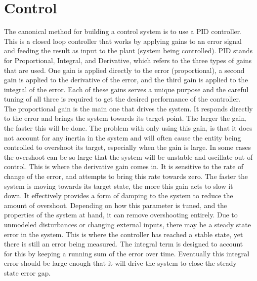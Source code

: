 \documentclass[letterpaper,12pt,titlepage,oneside,final]{book}
\begin{document}
\section{Control}


The canonical method for building a control system is to use a PID controller. This is a closed loop controller that works by applying gains to an error signal and feeding the result as input to the plant (system being controlled). PID stands for Proportional, Integral, and Derivative, which refers to the three types of gains that are used. One gain is applied directly to the error (proportional), a second gain is applied to the derivative of the error, and the third gain is applied to the integral of the error. Each of these gains serves a unique purpose and the careful tuning of all three is required to get the desired performance of the controller. The proportional gain is the main one that drives the system. It responds directly to the error and brings the system towards its target point. The larger the gain, the faster this will be done. The problem with only using this gain, is that it does not account for any inertia in the system and will often cause the entity being controlled to overshoot its target, especially when the gain is large. In some cases the overshoot can be so large that the system will be unstable and oscillate out of control. This is where the derivative gain comes in. It is sensitive to the rate of change of the error, and attempts to bring this rate towards zero. The faster the system is moving towards its target state, the more this gain acts to slow it down. It effectively provides a form of damping to the system to reduce the amount of overshoot. Depending on how this parameter is tuned, and the properties of the system at hand, it can remove overshooting entirely. Due to unmodeled disturbances or changing external inputs, there may be a steady state error in the system. This is where the controller has reached a stable state, yet there is still an error being measured. The integral term is designed to account for this by keeping a running sum of the error over time. Eventually this integral error should be large enough that it will drive the system to close the steady state error gap.
\end{document}
